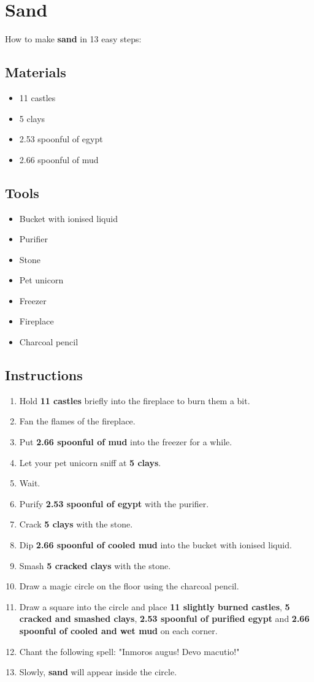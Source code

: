 \documentclass{article}
\begin{document}
\section{Sand}How to make \textbf{sand} in 13 easy steps:

\subsection{Materials}\begin{itemize}
\item 
11 castles
\item 
5 clays
\item 
2.53 spoonful of egypt
\item 
2.66 spoonful of mud
\end{itemize}
\subsection{Tools}\begin{itemize}
\item 
Bucket with ionised liquid
\item 
Purifier
\item 
Stone
\item 
Pet unicorn
\item 
Freezer
\item 
Fireplace
\item 
Charcoal pencil
\end{itemize}
\subsection{Instructions}\begin{enumerate}
\item 
Hold \textbf{11 castles} briefly into the fireplace to burn them a bit.
\item 
Fan the flames of the fireplace.
\item 
Put \textbf{2.66 spoonful of mud} into the freezer for a while.
\item 
Let your pet unicorn sniff at \textbf{5 clays}.
\item 
Wait.
\item 
Purify \textbf{2.53 spoonful of egypt} with the purifier.
\item 
Crack \textbf{5 clays} with the stone.
\item 
Dip \textbf{2.66 spoonful of cooled mud} into the bucket with ionised liquid.
\item 
Smash \textbf{5 cracked clays} with the stone.
\item 
Draw a magic circle on the floor using the charcoal pencil.
\item 
Draw a square into the circle and place \textbf{11 slightly burned castles}, \textbf{5 cracked and smashed clays}, \textbf{2.53 spoonful of purified egypt} and \textbf{2.66 spoonful of cooled and wet mud} on each corner.
\item 
Chant the following spell: "Inmoros augus! Devo macutio!"
\item 
Slowly, \textbf{sand} will appear inside the circle.
\end{enumerate}
\newpage
\end{document}
